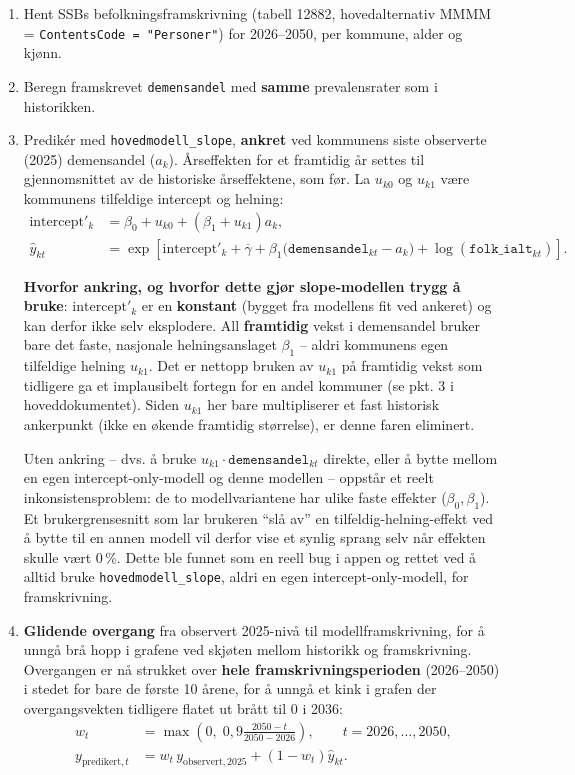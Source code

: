\documentclass[11pt,a4paper]{article}
\begin{document}
\begin{enumerate}[leftmargin=*,label=\arabic*.]
\item Hent SSBs befolkningsframskrivning (tabell 12882, hovedalternativ
MMMM = \texttt{ContentsCode = "Personer"}) for 2026--2050, per kommune,
alder og kjønn.

\item Beregn framskrevet \texttt{demensandel} med \textbf{samme}
prevalensrater som i historikken.

\item Predikér med \texttt{hovedmodell\_slope}, \textbf{ankret} ved
kommunens siste observerte (2025) demensandel (\(a_k\)). Årseffekten for
et framtidig år settes til gjennomsnittet av de historiske årseffektene,
som før. La \(u_{k0}\) og \(u_{k1}\) være kommunens tilfeldige intercept
og helning:
\begin{align}
\mathrm{intercept}'_k
&=
\beta_0+u_{k0}+(\beta_1+u_{k1})a_k,
\\
\widehat{y}_{kt}
&=
\exp\left[
\mathrm{intercept}'_k
+\overline{\gamma}
+\beta_1\bigl(
\texttt{demensandel}_{kt}-a_k
\bigr)
+\log(\texttt{folk\_ialt}_{kt})
\right].
\end{align}

\textbf{Hvorfor ankring, og hvorfor dette gjør slope-modellen trygg å
bruke}: \(\mathrm{intercept}'_k\) er en \textbf{konstant} (bygget fra
modellens fit ved ankeret) og kan derfor ikke selv eksplodere. All
\textbf{framtidig} vekst i demensandel bruker bare det faste, nasjonale
helningsanslaget \(\beta_1\) -- aldri kommunens egen tilfeldige helning
\(u_{k1}\). Det er nettopp bruken av \(u_{k1}\) på framtidig vekst som
tidligere ga et implausibelt fortegn for en andel kommuner (se pkt. 3 i
hoveddokumentet). Siden \(u_{k1}\) her bare multipliserer et fast
historisk ankerpunkt (ikke en økende framtidig størrelse), er denne faren
eliminert.

Uten ankring -- dvs. å bruke
\(u_{k1}\cdot\texttt{demensandel}_{kt}\) direkte, eller å bytte mellom en
egen intercept-only-modell og denne modellen -- oppstår et reelt
inkonsistensproblem: de to modellvariantene har ulike faste effekter
(\(\beta_0,\beta_1\)). Et brukergrensesnitt som lar brukeren ``slå av''
en tilfeldig-helning-effekt ved å bytte til en annen modell vil derfor
vise et synlig sprang selv når effekten skulle vært 0\,\%. Dette ble
funnet som en reell bug i appen og rettet ved å alltid bruke
\texttt{hovedmodell\_slope}, aldri en egen intercept-only-modell, for
framskrivning.

\item \textbf{Glidende overgang} fra observert 2025-nivå til
modellframskrivning, for å unngå brå hopp i grafene ved skjøten mellom
historikk og framskrivning. Overgangen er nå strukket over
\textbf{hele framskrivningsperioden} (2026--2050) i stedet for bare de
første 10 årene, for å unngå et kink i grafen der overgangsvekten
tidligere flatet ut brått til 0 i 2036:
\begin{align}
w_t
&=
\max\left(
0,\;
0{,}9\frac{2050-t}{2050-2026}
\right),
\qquad t=2026,\ldots,2050,
\\
y_{\mathrm{predikert},t}
&=
w_t\,y_{\mathrm{observert},2025}
+
(1-w_t)\widehat{y}_{kt}.
\end{align}


\end{enumerate}
\end{document}
